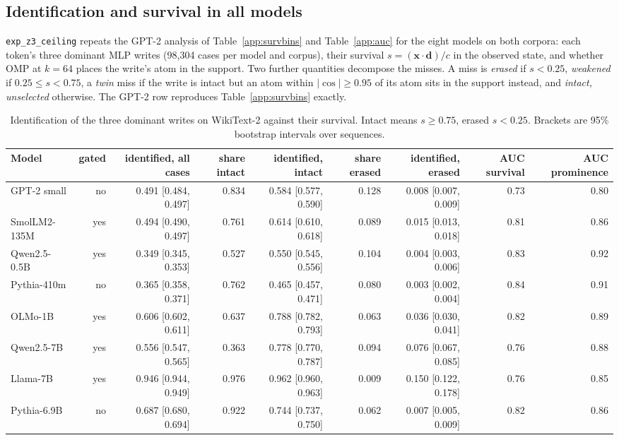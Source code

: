\subsection{Identification and survival in all models}\label{app:z3}
\texttt{exp\_z3\_ceiling} repeats the GPT-2 analysis of Table~\ref{app:survbins} and Table~\ref{app:auc} for the eight models on both corpora: each token's three dominant MLP writes (98,304 cases per model and corpus), their survival $s=(\mathbf{x}\cdot\mathbf{d})/c$ in the observed state, and whether OMP at $k=64$ places the write's atom in the support. Two further quantities decompose the misses. A miss is \emph{erased} if $s<0.25$, \emph{weakened} if $0.25\le s<0.75$, a \emph{twin} miss if the write is intact but an atom within $|\cos|\ge0.95$ of its atom sits in the support instead, and \emph{intact, unselected} otherwise. The GPT-2 row reproduces Table~\ref{app:survbins} exactly.
\begin{table}[H]\centering\scriptsize
\caption{Identification of the three dominant writes on WikiText-2 against their survival. Intact means $s\ge0.75$, erased $s<0.25$. Brackets are 95\% bootstrap intervals over sequences.}\label{app:z3-surv-wikitext}
\begin{adjustbox}{max width=\linewidth}
\begin{tabular}{lrrrrrrrr}\toprule
Model & gated & identified, all cases & share intact & identified, intact & share erased & identified, erased & AUC survival & AUC prominence \\ \midrule
GPT-2 small & no & 0.491 [0.484, 0.497] & 0.834 & 0.584 [0.577, 0.590] & 0.128 & 0.008 [0.007, 0.009] & 0.73 & 0.80 \\
SmolLM2-135M & yes & 0.494 [0.490, 0.497] & 0.761 & 0.614 [0.610, 0.618] & 0.089 & 0.015 [0.013, 0.018] & 0.81 & 0.86 \\
Qwen2.5-0.5B & yes & 0.349 [0.345, 0.353] & 0.527 & 0.550 [0.545, 0.556] & 0.104 & 0.004 [0.003, 0.006] & 0.83 & 0.92 \\
Pythia-410m & no & 0.365 [0.358, 0.371] & 0.762 & 0.465 [0.457, 0.471] & 0.080 & 0.003 [0.002, 0.004] & 0.84 & 0.91 \\
OLMo-1B & yes & 0.606 [0.602, 0.611] & 0.637 & 0.788 [0.782, 0.793] & 0.063 & 0.036 [0.030, 0.041] & 0.82 & 0.89 \\
Qwen2.5-7B & yes & 0.556 [0.547, 0.565] & 0.363 & 0.778 [0.770, 0.787] & 0.094 & 0.076 [0.067, 0.085] & 0.76 & 0.88 \\
Llama-7B & yes & 0.946 [0.944, 0.949] & 0.976 & 0.962 [0.960, 0.963] & 0.009 & 0.150 [0.122, 0.178] & 0.76 & 0.85 \\
Pythia-6.9B & no & 0.687 [0.680, 0.694] & 0.922 & 0.744 [0.737, 0.750] & 0.062 & 0.007 [0.005, 0.009] & 0.82 & 0.86 \\
\bottomrule\end{tabular}\end{adjustbox}
\end{table}
